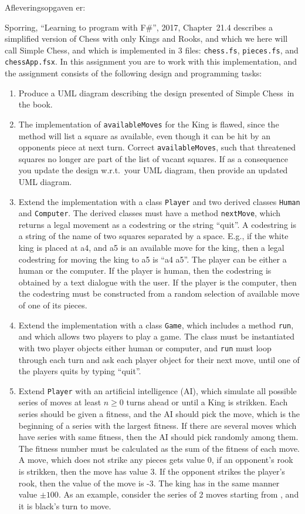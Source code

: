 \documentclass[a4paper,12pt]{article}
\newcommand{\chess}{Simple Chess}
\begin{document}
Afleveringsopgaven er:

Sporring, ``Learning to program with F\#'', 2017, Chapter~21.4 describes a simplified version of Chess with only Kings and Rooks, and which we here will call \chess, and which is implemented in 3 files: \lstinline{chess.fs}, \lstinline{pieces.fs}, and \lstinline{chessApp.fsx}. In this assignment you are to work with this implementation, and the assignment consists of the following design and programming tasks:
\begin{enumerate}[label=11g.\arabic*,start=0]
\item Produce a UML diagram describing the design presented of \chess\ in the book.
\item The implementation of \lstinline{availableMoves} for the King is flawed, since the method will list a square as available, even though it can be hit by an opponents piece at next turn. Correct \lstinline{availableMoves}, such that threatened squares no longer are part of the list of vacant squares. If as a consequence you update the design w.r.t.\ your UML diagram, then provide an updated UML diagram.
\item Extend the implementation with a class \lstinline{Player} and two derived classes \lstinline{Human} and \lstinline{Computer}. The derived classes must have a method \lstinline{nextMove}, which returns a legal movement as a codestring or the string ``quit''.  A codestring is a string of the name of two squares separated by a space. E.g., if the white king is placed at a4, and a5 is an available move for the king, then a legal codestring for moving the king to a5 is ``a4 a5''. The player can be either a human or the computer. If the player is human, then the codestring is obtained by a text dialogue with the user. If the player is the computer, then the codestring must be constructed from a random selection of available move of one of its pieces.
\item Extend the implementation with a class \lstinline{Game}, which includes a method \lstinline{run}, and which allows two players to play a game. The class must be instantiated with two player objects either human or computer, and \lstinline{run} must loop through each turn and ask each player object for their next move, until one of the players quits by typing ``quit''.
\item Extend \lstinline{Player} with an artificial intelligence (AI), which simulate all possible series of moves at least $n \geq 0$ turns ahead or until a King is strikken. Each series should be given a fitness, and the AI should pick the move, which is the beginning of a series with the largest fitness. If there are several moves which have series with same fitness, then the AI should pick randomly among them. The fitness number must be calculated as the sum of the fitness of each move. A move, which does not strike any pieces gets value 0, if an opponent's rook is strikken, then the move has value 3. If the opponent strikes the player's rook, then the value of the move is -3. The king has in the same manner value $\pm100$. As an example, consider the series of 2 moves starting from , and it is black's turn to move.

\end{enumerate}
\end{document}
